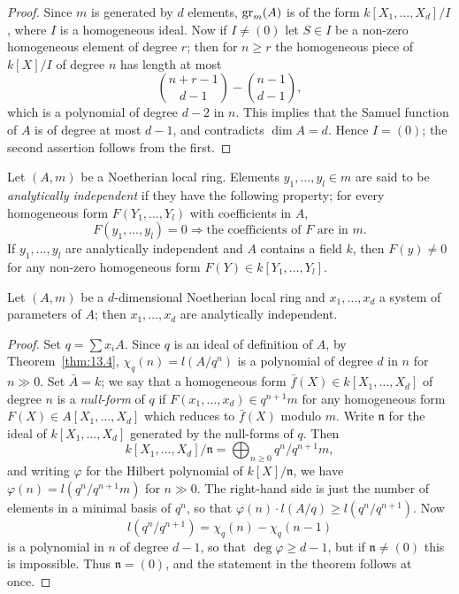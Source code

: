 \begin{proof}
Since $m$ is generated by $d$ elements, $\operatorname{gr}_m(A)$ is of the form
$k[X_1, \ldots, X_d]/I$, where $I$ is a homogeneous ideal. Now if $I \neq (0)$ let $S \in I$ be a
non-zero homogeneous element of degree $r$; then for $n \ge r$ the homogeneous
piece of $k[X]/I$ of degree $n$ has length at most
\[
  \binom{n+r-1}{d-1} - \binom{n-1}{d-1},
\]
which is a polynomial of degree $d - 2$ in $n$. This
implies that the Samuel function of $A$ is of degree at most $d - 1$, and
contradicts $\dim A = d$. Hence $I = (0)$; the second assertion follows from
the first.
\end{proof}

Let $(A, m)$ be a Noetherian local ring. Elements $y_1, \ldots, y_l \in m$ are said to be
\emph{analytically independent} if they have the following property; for every
homogeneous form $F(Y_1, \ldots, Y_l)$ with coefficients in $A$,
\[
  F(y_1, \ldots, y_l) = 0 \Rightarrow \text{the coefficients of } F \text{ are in } m.
\]
If $y_1, \ldots, y_l$ are analytically independent and $A$ contains a field $k$, then
$F(y) \neq 0$ for any non-zero homogeneous form $F(Y) \in k[Y_1, \ldots, Y_l]$.

\begin{theorem}\label{thm:14.5}
Let $(A, m)$ be a $d$-dimensional Noetherian local ring and
$x_1, \ldots, x_d$ a system of parameters of $A$; then $x_1, \ldots, x_d$ are analytically
independent.
\end{theorem}

\begin{proof}
Set $q = \sum x_iA$. Since $q$ is an ideal of definition of $A$, by
Theorem~\ref{thm:13.4}, $\chi_q(n) = l(A/q^n)$ is a polynomial of degree $d$ in $n$ for $n \gg 0$. Set
$\bar{A} = k$; we say that a homogeneous form $\bar{f}(X) \in k[X_1, \ldots, X_d]$ of degree $n$
is a \emph{null-form} of $q$ if $F(x_1, \ldots, x_d) \in q^{n+1}m$ for any homogeneous form
$F(X) \in A[X_1, \ldots, X_d]$ which reduces to $\bar{f}(X)$ modulo $m$. Write $\mathfrak{n}$ for the ideal
of $k[X_1, \ldots, X_d]$ generated by the null-forms of $q$. Then
\[
  k[X_1, \ldots, X_d]/\mathfrak{n} = \bigoplus_{n \ge 0} q^n/q^{n+1}m,
\]
and writing $\varphi$ for the Hilbert polynomial of $k[X]/\mathfrak{n}$, we have $\varphi(n)
= l(q^n/q^{n+1}m)$ for $n \gg 0$. The right-hand side is just the number of elements in a
minimal basis of $q^n$, so that $\varphi(n) \cdot l(A/q) \ge l(q^n/q^{n+1})$. Now
\[
  l(q^n/q^{n+1}) = \chi_q(n) - \chi_q(n - 1)
\]
is a polynomial in $n$ of degree $d - 1$, so that $\deg \varphi \ge d - 1$, but if $\mathfrak{n} \neq (0)$ this
is impossible. Thus $\mathfrak{n} = (0)$, and the statement in the theorem follows at
once.
\end{proof}

